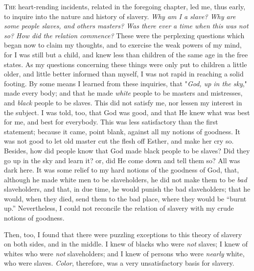 \textsc{The} heart-rending incidents, related in the foregoing chapter,
led me, thus early, to inquire into the nature and history of slavery.
\emph{Why am I a slave? Why are some people slaves, and others masters?
Was there ever a time when this was not so? How did the relation
commence?} These were the perplexing questions which began now to claim
my thoughts, and to exercise the weak powers of my mind, for I was still
but a child, and knew less than children of the same age in the free
states. As my questions concerning these things were only put to
children a little older, and little better informed than myself, I was
not rapid in reaching a solid footing. By some means I learned from
these inquiries, that "\emph{God, up in the sky}," made every body; and
that he made \emph{white} people to be masters and mistresses, and
\emph{black} people to be slaves. This did not satisfy me, nor lessen my
interest in the subject. I was told, too,
{\protect\hypertarget{90}{}{}}that God was good, and that He knew what
was best for me, and best for everybody. This was less satisfactory than
the first statement; because it came, point blank, against all my
notions of goodness. It was not good to let old master cut the flesh off
Esther, and make her cry so. Besides, how did people know that God made
black people to be slaves? Did they go up in the sky and learn it? or,
did He come down and tell them so? All was dark here. It was some relief
to my hard notions of the goodness of God, that, although he made white
men to be slaveholders, he did not make them to be \emph{bad}
slaveholders, and that, in due time, he would punish the bad
slaveholders; that he would, when they died, send them to the bad place,
where they would be ``burnt up.'' Nevertheless, I could not reconcile
the relation of slavery with my crude notions of goodness.

Then, too, I found that there were puzzling exceptions to this theory of
slavery on both sides, and in the middle. I knew of blacks who were
\emph{not} slaves; I knew of whites who were \emph{not} slaveholders;
and I knew of persons who were \emph{nearly} white, who were slaves.
\emph{Color}, therefore, was a very unsatisfactory basis for slavery.

